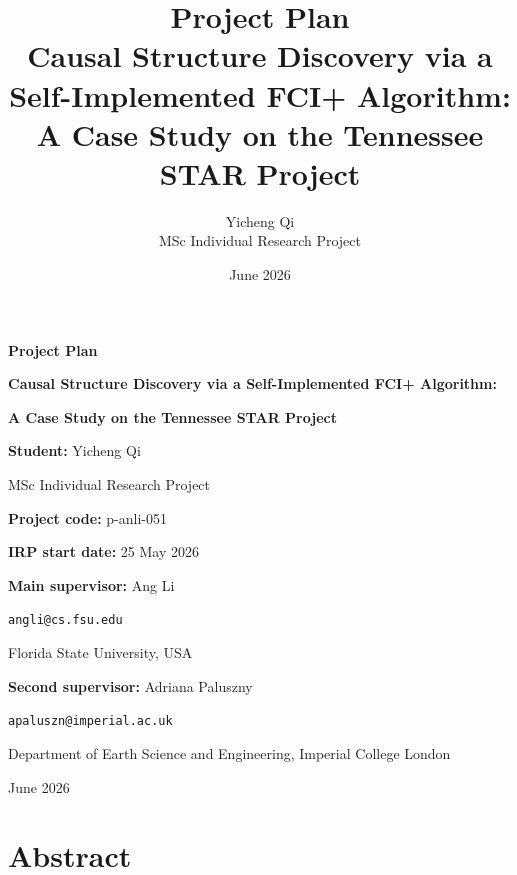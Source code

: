 \documentclass[11pt,a4paper]{article}
\title{\textbf{Project Plan}\\[0.5em]
Causal Structure Discovery via a Self-Implemented FCI+ Algorithm:\\
A Case Study on the Tennessee STAR Project}
\author{Yicheng Qi\\
MSc Individual Research Project}
\date{June 2026}
\begin{document}
\begin{titlepage}
    \centering
    \vspace*{2cm}
    {\LARGE \textbf{Project Plan}\par}
    \vspace{1cm}
    {\Large \textbf{Causal Structure Discovery via a Self-Implemented FCI+ Algorithm:}\par}
    \vspace{0.25cm}
    {\Large \textbf{A Case Study on the Tennessee STAR Project}\par}
    \vspace{1.6cm}
    {\large \textbf{Student:} Yicheng Qi\par}
    \vspace{0.3cm}
    {\large MSc Individual Research Project\par}
    \vspace{0.3cm}
    {\large \textbf{Project code:} p-anli-051\par}
    \vspace{0.3cm}
    {\large \textbf{IRP start date:} 25 May 2026\par}
    \vspace{0.9cm}
    {\large \textbf{Main supervisor:} Ang Li\par}
    \vspace{0.15cm}
    {\large \texttt{angli@cs.fsu.edu}\par}
    \vspace{0.15cm}
    {\large Florida State University, USA\par}
    \vspace{0.55cm}
    {\large \textbf{Second supervisor:} Adriana Paluszny\par}
    \vspace{0.15cm}
    {\large \texttt{apaluszn@imperial.ac.uk}\par}
    \vspace{0.15cm}
    {\large Department of Earth Science and Engineering, Imperial College London\par}
    \vfill
    {\large June 2026\par}
\end{titlepage}

\section*{Abstract}
\end{document}
